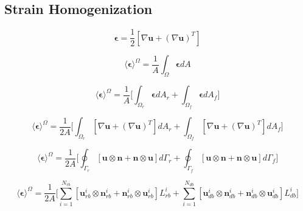 \subsection{Strain Homogenization}

\begin{equation}
\label{eqn:strain1}
\boldsymbol{\epsilon} = 
\frac{1}{2}  \left[ \nabla \mathbf{u} + \left( \nabla \mathbf{u} \right)^{T} \right]
\end{equation}

\begin{equation}
\label{eqn:strain2}
\langle \boldsymbol{\epsilon} \rangle^\Omega = 
\frac{1}{A} \int_\Omega \boldsymbol{\epsilon} { dA}
\end{equation}

\begin{equation}
\label{eqn:strain3}
\langle \boldsymbol{\epsilon} \rangle^\Omega = 
\frac{1}{A} \bigg \lbrack {\int_{\Omega_{r}} \boldsymbol{\epsilon} { dA_r} + 
\int_{\Omega_{f}} \boldsymbol{\epsilon} { dA_f}} \bigg \rbrack
\end{equation}

\begin{equation}
\label{eqn:strain4}
\langle \boldsymbol{\epsilon} \rangle^\Omega = 
\frac{1}{2 A} \bigg \lbrack {\int_{\Omega_{r}} \left[ \nabla \mathbf{u} + 
\left( \nabla \mathbf{u} \right)^{T} \right] {dA_r} +
\int_{\Omega_{f}} \left[ \nabla \mathbf{u} + 
\left( \nabla \mathbf{u} \right)^{T} \right] { dA_f}} \bigg \rbrack
\end{equation}

\begin{equation}
\label{eqn:strain5}
\langle \boldsymbol{\epsilon} \rangle^\Omega = 
\frac{1}{2 A} \bigg \lbrack {\oint_{\Gamma_{r}} \left[ \mathbf{u} \otimes \mathbf{n} + 
\mathbf{n} \otimes \mathbf{u} \right] {d \Gamma_r} +
\oint_{\Gamma_{f}} \left[ \mathbf{u} \otimes \mathbf{n} + 
\mathbf{n} \otimes \mathbf{u} \right] { d \Gamma_f}} \bigg \rbrack
\end{equation}

\begin{equation}
\label{eqn:strain6}
\langle \boldsymbol{\epsilon} \rangle^\Omega = 
\frac{1}{2 A} \bigg \lbrack {\sum_{i=1}^{N_{rb}} \left[ \mathbf{u}_{rb}^i \otimes \mathbf{n}_{rb}^i + 
\mathbf{n}_{rb}^i \otimes \mathbf{u}_{rb}^i \right] {L_{rb}^i} +
\sum_{i=1}^{N_{db}} \left[ \mathbf{u}_{db}^i \otimes \mathbf{n}_{db}^i + 
\mathbf{n}_{db}^i \otimes \mathbf{u}_{db}^i \right] {L_{db}^i}} \bigg \rbrack
\end{equation}
